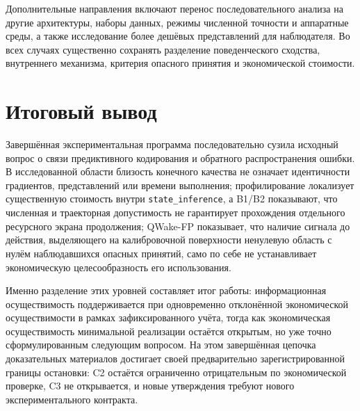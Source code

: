 Дополнительные направления включают перенос последовательного анализа на
другие архитектуры, наборы данных, режимы численной точности и аппаратные
среды, а также исследование более дешёвых представлений для наблюдателя. Во
всех случаях существенно сохранять разделение поведенческого сходства,
внутреннего механизма, критерия опасного принятия и экономической стоимости.

\section{Итоговый вывод}

Завершённая экспериментальная программа последовательно сузила исходный вопрос
о связи предиктивного кодирования и обратного распространения ошибки. В
исследованной области близость конечного качества не означает идентичности
градиентов, представлений или времени выполнения; профилирование локализует
существенную стоимость внутри \texttt{state\_inference}, а B1/B2 показывают, что
численная и траекторная допустимость не гарантирует прохождения отдельного
ресурсного экрана продолжения; QWake-FP
показывает, что наличие сигнала до действия, выделяющего на калибровочной
поверхности ненулевую область с нулём наблюдавшихся опасных принятий, само по
себе не устанавливает экономическую целесообразность его использования.

Именно разделение этих уровней составляет итог работы: информационная
осуществимость поддерживается при одновременно отклонённой экономической
осуществимости в рамках зафиксированного учёта, тогда как экономическая
осуществимость минимальной реализации остаётся открытым, но уже точно
сформулированным следующим вопросом. На этом завершённая цепочка доказательных
материалов достигает своей предварительно зарегистрированной границы остановки:
C2 остаётся ограниченно отрицательным по экономической проверке, C3 не
открывается, и новые утверждения требуют нового экспериментального контракта.
